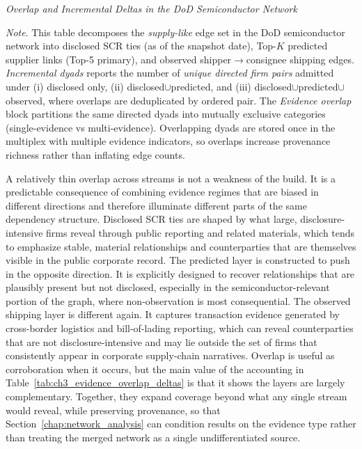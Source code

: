 \begin{table}[tbp]
\centering
\caption[\textit{Overlap and incremental deltas}]
{\textit{Overlap and Incremental Deltas in the DoD Semiconductor Network}}
\label{tab:ch3_evidence_overlap_deltas}

\begin{adjustbox}{max width=\linewidth}

\end{adjustbox}

\captionsetup{justification=raggedright,singlelinecheck=false}
\caption*{\footnotesize \textit{Note}. This table decomposes the \emph{supply-like} edge set in the DoD semiconductor network into disclosed SCR ties (as of the snapshot date), Top-$K$ predicted supplier links (Top-5 primary), and observed shipper$\rightarrow$consignee shipping edges. \emph{Incremental dyads} reports the number of \emph{unique directed firm pairs} admitted under (i) disclosed only, (ii) disclosed$\cup$predicted, and (iii) disclosed$\cup$predicted$\cup$observed, where overlaps are deduplicated by ordered pair. The \emph{Evidence overlap} block partitions the same directed dyads into mutually exclusive categories (single-evidence vs multi-evidence). Overlapping dyads are stored once in the multiplex with multiple evidence indicators, so overlaps increase provenance richness rather than inflating edge counts.}%
\end{table}

A relatively thin overlap across streams is not a weakness of the build. It is a predictable consequence of combining evidence regimes that are biased in different directions and therefore illuminate different parts of the same dependency structure. Disclosed SCR ties are shaped by what large, disclosure-intensive firms reveal through public reporting and related materials, which tends to emphasize stable, material relationships and counterparties that are themselves visible in the public corporate record. The predicted layer is constructed to push in the opposite direction. It is explicitly designed to recover relationships that are plausibly present but not disclosed, especially in the semiconductor-relevant portion of the graph, where non-observation is most consequential. The observed shipping layer is different again. It captures transaction evidence generated by cross-border logistics and bill-of-lading reporting, which can reveal counterparties that are not disclosure-intensive and may lie outside the set of firms that consistently appear in corporate supply-chain narratives. Overlap is useful as corroboration when it occurs, but the main value of the accounting in Table~\ref{tab:ch3_evidence_overlap_deltas} is that it shows the layers are largely complementary. Together, they expand coverage beyond what any single stream would reveal, while preserving provenance, so that Section~\ref{chap:network_analysis} can condition results on the evidence type rather than treating the merged network as a single undifferentiated source.

